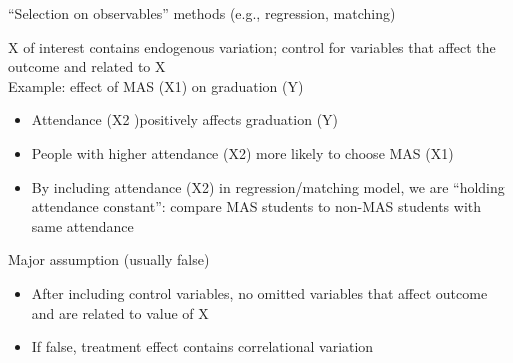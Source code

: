\begin{frame}{``Selection on observables'' methods (e.g., regression, matching)}
	
	X of interest contains endogenous variation; control for variables that affect the outcome and related to X \\
	\vspace{2mm}
	Example: effect of MAS (X1) on graduation (Y)
	\begin{itemize}
		\item Attendance (X2 )positively affects graduation (Y)
		\item People with higher attendance (X2) more likely to choose MAS (X1)
		\item By including attendance (X2) in regression/matching model, we are ``holding attendance constant'': compare MAS students to non-MAS students with same attendance
	\end{itemize}
	\vspace{2mm}		
	Major assumption (usually false)
	\begin{itemize}
		\item After including control variables, no omitted variables that affect outcome and are related to value of X
		\item If false, treatment effect contains correlational variation
	\end{itemize}
	
	

\end{frame}

